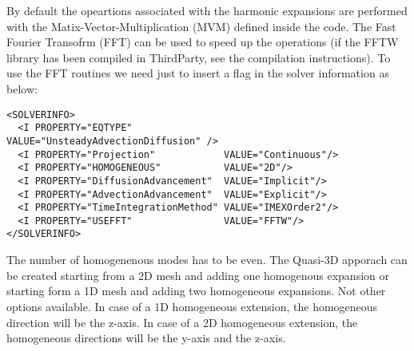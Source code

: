 By default the opeartions associated with the harmonic expansions are performed
with the Matix-Vector-Multiplication (MVM) defined inside the code. The Fast
Fourier Transofrm (FFT) can be used to speed up the operations (if the FFTW
library has been compiled in ThirdParty, see the compilation instructions). To
use the FFT routines we need just to insert a flag in the solver information as
below:

\begin{lstlisting}[style=XMLStyle]
<SOLVERINFO>
  <I PROPERTY="EQTYPE"                VALUE="UnsteadyAdvectionDiffusion" />
  <I PROPERTY="Projection"            VALUE="Continuous"/>
  <I PROPERTY="HOMOGENEOUS"           VALUE="2D"/>
  <I PROPERTY="DiffusionAdvancement"  VALUE="Implicit"/>
  <I PROPERTY="AdvectionAdvancement"  VALUE="Explicit"/>
  <I PROPERTY="TimeIntegrationMethod" VALUE="IMEXOrder2"/>
  <I PROPERTY="USEFFT"                VALUE="FFTW"/>
</SOLVERINFO>
\end{lstlisting}

The number of homogenenous modes has to be even. The Quasi-3D apporach can be
created starting from a 2D mesh and adding one homogenous expansion or starting
form a 1D mesh and adding two homogeneous expansions. Not other options
available. In case of a 1D homogeneous extension, the homogeneous direction will
be the z-axis. In case of a 2D homogeneous extension, the homogeneous directions
will be the y-axis and the z-axis.

